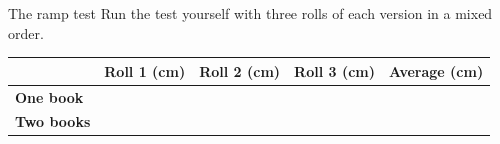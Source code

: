 \begin{tryit}{The ramp test}
Run the test yourself with three rolls of each version in a mixed order.\par\medskip
\renewcommand{\arraystretch}{1.6}
\begin{tabular}{|l|c|c|c|c|}
\hline
 & \textbf{Roll 1 (cm)} & \textbf{Roll 2 (cm)} & \textbf{Roll 3 (cm)} & \textbf{Average (cm)}\\ \hline
\textbf{One book} & & & & \\ \hline
\textbf{Two books} & & & & \\ \hline
\end{tabular}
\end{tryit}
\clearpage

